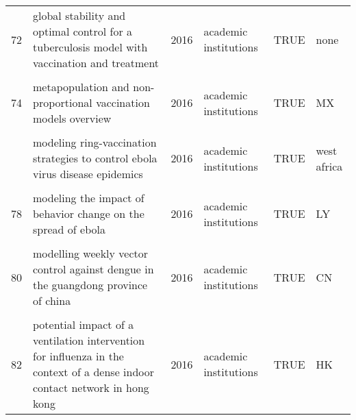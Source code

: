 \documentclass[
]{article}
\begin{document}
\begin{landscape}
\begin{longtable}{l>{\raggedright\arraybackslash}p{4cm}l>{\raggedright\arraybackslash}p{3.5cm}l>{\raggedright\arraybackslash}p{1.5cm}}
72 & global stability and optimal control for a tuberculosis model with vaccination and treatment & 2016 & academic institutions & TRUE & none\\
\cellcolor{gray!6}{73} & \cellcolor{gray!6}{impact on epidemic measles of vaccination campaigns triggered by disease outbreaks or serosurveys: a modeling study} & \cellcolor{gray!6}{2016} & \cellcolor{gray!6}{academic institutions + NGO} & \cellcolor{gray!6}{FALSE} & \cellcolor{gray!6}{NP NE YE ZM}\\
74 & metapopulation and non-proportional vaccination models overview & 2016 & academic institutions & TRUE & MX\\
\cellcolor{gray!6}{75} & \cellcolor{gray!6}{model-based comprehensive analysis of school closure policies for mitigating influenza epidemics and pandemics} & \cellcolor{gray!6}{2016} & \cellcolor{gray!6}{academic institutions + government institutions + NGO} & \cellcolor{gray!6}{FALSE} & \cellcolor{gray!6}{GB}\\
\addlinespace
76 & modeling ring-vaccination strategies to control ebola virus disease epidemics & 2016 & academic institutions & TRUE & west africa\\
\cellcolor{gray!6}{77} & \cellcolor{gray!6}{modeling the effect of public health resources and alerting on the dynamics of pertussis spread*} & \cellcolor{gray!6}{2016} & \cellcolor{gray!6}{academic institutions + government institutions} & \cellcolor{gray!6}{FALSE} & \cellcolor{gray!6}{US}\\
78 & modeling the impact of behavior change on the spread of ebola & 2016 & academic institutions & TRUE & LY\\
\cellcolor{gray!6}{79} & \cellcolor{gray!6}{modeling the spread of polio in an ipv-vaccinated population: lessons learned from the 2013 silent outbreak in southern israel} & \cellcolor{gray!6}{2016} & \cellcolor{gray!6}{academic institutions} & \cellcolor{gray!6}{TRUE} & \cellcolor{gray!6}{IL}\\
80 & modelling weekly vector control against dengue in the guangdong province of china & 2016 & academic institutions & TRUE & CN\\
\addlinespace
\cellcolor{gray!6}{81} & \cellcolor{gray!6}{optimal control strategies for the spread of ebola in west africa} & \cellcolor{gray!6}{2016} & \cellcolor{gray!6}{academic institutions} & \cellcolor{gray!6}{TRUE} & \cellcolor{gray!6}{west africa}\\
82 & potential impact of a ventilation intervention for influenza in the context of a dense indoor contact network in hong kong & 2016 & academic institutions & TRUE & HK\\

\end{longtable}
\end{landscape}
\end{document}
